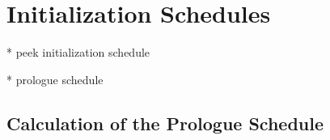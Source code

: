 \section{Initialization Schedules}

* peek initialization schedule

* prologue schedule

\subsection{Calculation of the Prologue Schedule}